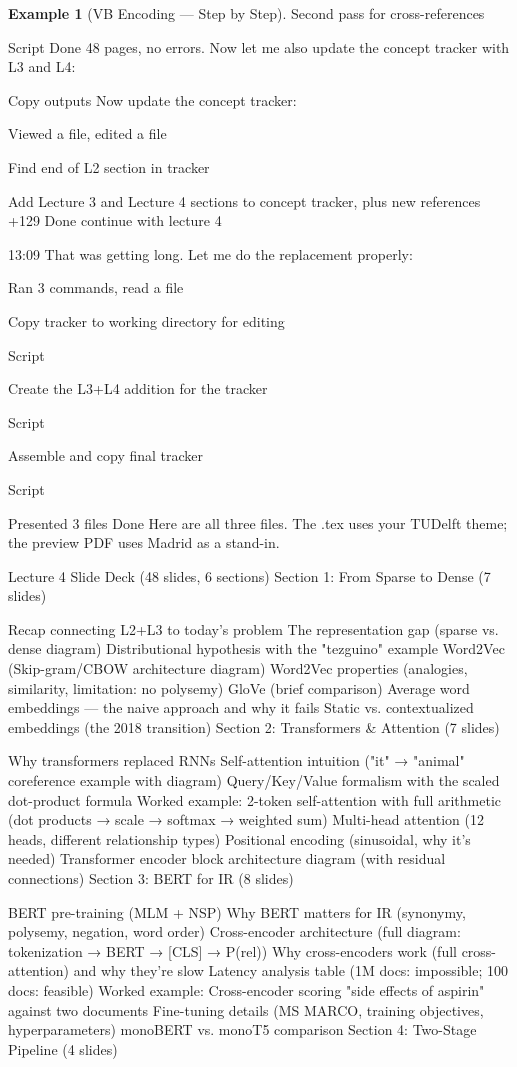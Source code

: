 \documentclass[aspectratio=169]{beamer} \usetheme{TUDelft} %
\theoremstyle{definition}
\newtheorem{example}{Example}[section]
\theoremstyle{plain}
\begin{document}
\begin{example}[VB Encoding --- Step by Step]
Second pass for cross-references

Script
Done
48 pages, no errors. Now let me also update the concept tracker with L3 and L4:


Copy outputs
Now update the concept tracker:


Viewed a file, edited a file

Find end of L2 section in tracker

Add Lecture 3 and Lecture 4 sections to concept tracker, plus new references
+129
Done
continue with lecture 4

13:09
That was getting long. Let me do the replacement properly:


Ran 3 commands, read a file

Copy tracker to working directory for editing

Script

Create the L3+L4 addition for the tracker

Script

Assemble and copy final tracker

Script

Presented 3 files
Done
Here are all three files. The .tex uses your TUDelft theme; the preview PDF uses Madrid as a stand-in.

Lecture 4 Slide Deck (48 slides, 6 sections)
Section 1: From Sparse to Dense (7 slides)

Recap connecting L2+L3 to today's problem
The representation gap (sparse vs. dense diagram)
Distributional hypothesis with the "tezguino" example
Word2Vec (Skip-gram/CBOW architecture diagram)
Word2Vec properties (analogies, similarity, limitation: no polysemy)
GloVe (brief comparison)
Average word embeddings — the naive approach and why it fails
Static vs. contextualized embeddings (the 2018 transition)
Section 2: Transformers & Attention (7 slides)

Why transformers replaced RNNs
Self-attention intuition ("it" → "animal" coreference example with diagram)
Query/Key/Value formalism with the scaled dot-product formula
Worked example: 2-token self-attention with full arithmetic (dot products → scale → softmax → weighted sum)
Multi-head attention (12 heads, different relationship types)
Positional encoding (sinusoidal, why it's needed)
Transformer encoder block architecture diagram (with residual connections)
Section 3: BERT for IR (8 slides)

BERT pre-training (MLM + NSP)
Why BERT matters for IR (synonymy, polysemy, negation, word order)
Cross-encoder architecture (full diagram: tokenization → BERT → [CLS] → P(rel))
Why cross-encoders work (full cross-attention) and why they're slow
Latency analysis table (1M docs: impossible; 100 docs: feasible)
Worked example: Cross-encoder scoring "side effects of aspirin" against two documents
Fine-tuning details (MS MARCO, training objectives, hyperparameters)
monoBERT vs. monoT5 comparison
Section 4: Two-Stage Pipeline (4 slides)


\end{example}
\end{document}
